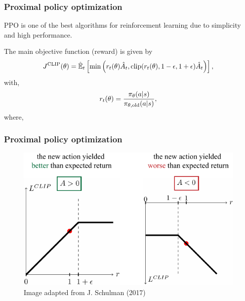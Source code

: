 \begin{frame}
	\frametitle{Proximal policy optimization}
	
	PPO is one of the best algorithms for reinforcement learning due to simplicity and high performance\footnotemark[1].
	
	\begin{center}
		\begin{minipage}{9cm}
			\begin{myexampleblock}[9cm]{}
				The main objective function {\color{gray} (reward)} is given by
				\begin{equation*}
					J^{\mathrm{CLIP}}(\theta) = \hat{\mathbb{E}}_{t} \left[ \mathrm{min} \left(  r_{t}(\theta)  \hat{A}_{t},  \mathrm{clip} (r_{t}(\theta) , 1-\epsilon, 1+\epsilon) \hat{A}_{t}  \right)  \right],			
				\end{equation*}	
				with,
				\begin{equation*}
					r_{t}(\theta) =\frac{\pi_{\theta}(a|s)}{\pi_{\theta, \mathrm{old}}(a|s) },
				\end{equation*}
				where,
				\newline
				\hspace{10px}
			\end{myexampleblock}
		\end{minipage}
	\end{center}
	
\end{frame}

\begin{frame}
	\frametitle{Proximal policy optimization}
	\begin{figure}
		\centering
		\includegraphics{advantage.pdf}
		\caption{Image adapted from J. Schulman (2017)}
	\end{figure}
	
\end{frame}

